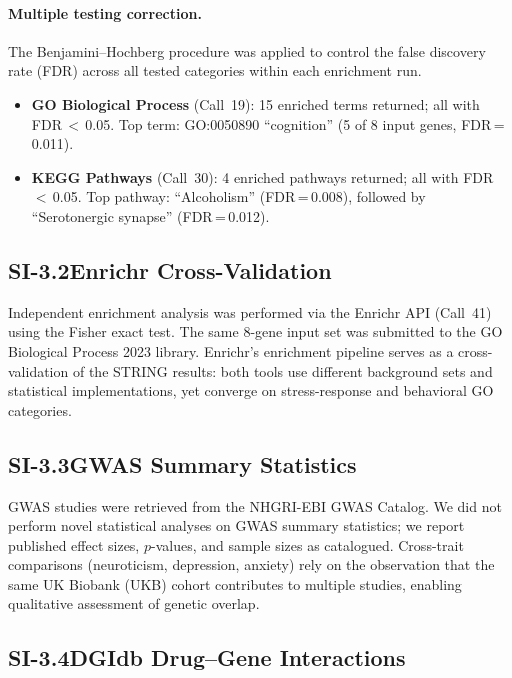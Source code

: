 \paragraph{Multiple testing correction.}
The Benjamini--Hochberg procedure was applied to control the false discovery
rate (FDR) across all tested categories within each enrichment run.

\begin{itemize}[nosep]
  \item \textbf{GO Biological Process} (Call~19): 15 enriched terms returned;
        all with FDR\,$<$\,0.05.  Top term: GO:0050890 ``cognition'' (5 of
        8 input genes, FDR\,=\,0.011).
  \item \textbf{KEGG Pathways} (Call~30): 4 enriched pathways returned; all
        with FDR\,$<$\,0.05.  Top pathway: ``Alcoholism'' (FDR\,=\,0.008),
        followed by ``Serotonergic synapse'' (FDR\,=\,0.012).
\end{itemize}

\subsection*{SI-3.2\quad Enrichr Cross-Validation}

Independent enrichment analysis was performed via the Enrichr API (Call~41)
using the Fisher exact test.  The same 8-gene input set was submitted to
the GO Biological Process 2023 library.  Enrichr's enrichment pipeline
serves as a cross-validation of the STRING results: both tools use different
background sets and statistical implementations, yet converge on
stress-response and behavioral GO categories.

\subsection*{SI-3.3\quad GWAS Summary Statistics}

GWAS studies were retrieved from the NHGRI-EBI GWAS Catalog.  We did not
perform novel statistical analyses on GWAS summary statistics; we report
published effect sizes, $p$-values, and sample sizes as catalogued.  Cross-trait
comparisons (neuroticism, depression, anxiety) rely on the observation that the
same UK Biobank (UKB) cohort contributes to multiple studies, enabling
qualitative assessment of genetic overlap.

\subsection*{SI-3.4\quad DGIdb Drug--Gene Interactions}

